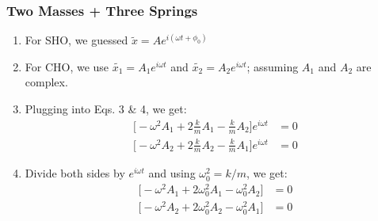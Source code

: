 \documentclass[pdf,hideothersubsections]{beamer}
\begin{document}
\begin{frame}
\frametitle{Two Masses + Three Springs}
    \pause
\begin{enumerate}
\item For SHO, we guessed $\tilde{x} = A e^{i (\omega t + \phi_0)}$
\pause
\item For CHO, we use $\tilde{x_1} = A_1 e^{i \omega t}$ and
  $\tilde{x_2} = A_2 e^{i \omega t}$; assuming $A_1$ and $A_2$ are complex.
\pause
\item Plugging into Eqs. 3 \& 4, we get: \\
\begin{align*}
\Big[ -\omega^2 A_1 + 2 \frac{k}{m}A_1 - \frac{k}{m}A_2 \Big] e^{i
  \omega t} &= 0 \\
\Big[ -\omega^2 A_2 + 2 \frac{k}{m}A_2 - \frac{k}{m}A_1 \Big] e^{i
  \omega t} &= 0
\end{align*}
\pause
\item Divide both sides by $e^{i \omega t}$ and using $\omega_0^2 =
  k/m$, we get:
\pause
\begin{align*}
\Big[ -\omega^2 A_1 + 2 \omega_0^2 A_1 - \omega_0^2 A_2 \Big] &= 0 \\
\Big[ -\omega^2 A_2 + 2 \omega_0^2 A_2 - \omega_0^2 A_1 \Big] &= 0
\end{align*}

\end{enumerate}
\end{frame}
\end{document}

